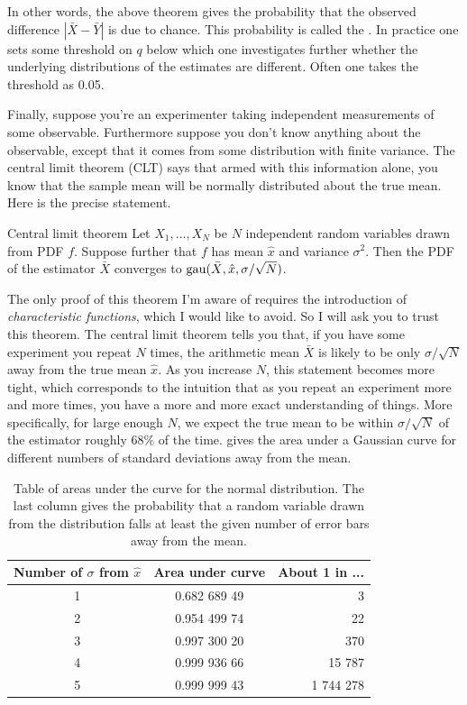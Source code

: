 In other words, the above theorem gives the probability that the
observed difference $|\bar{X}-\bar{Y}|$ is due to chance. This probability
is called the . In practice one sets some
threshold on $q$ below which one investigates further whether the
underlying distributions of the estimates are different. Often one
takes the threshold as 0.05.

Finally, suppose you're an experimenter taking independent measurements of
some observable. Furthermore suppose you don't know anything about the
observable, except that it comes from some distribution with finite variance.
The central limit theorem (CLT) says that armed with this information alone,
you know that the sample mean will be normally distributed about
the true mean. Here is the precise statement.
\begin{theorem}{Central limit theorem}{}
  Let $X_1,...,X_N$ be $N$ independent random variables drawn from PDF $f$.
  Suppose further that $f$ has mean $\hat{x}$ and variance $\sigma^2$.
  Then the PDF of the estimator $\bar{X}$ converges to
  $\operatorname{gau}(\bar{X},\hat{x},\sigma/\sqrt{N})$.
\end{theorem}
The only proof of this theorem I'm aware of requires the introduction of
{\it characteristic functions}, which I would like to avoid. So I will ask you
to trust this theorem. The central limit theorem tells you that, if you have
some experiment you repeat $N$ times, the arithmetic mean $\bar{X}$ is likely to
be only $\sigma/\sqrt{N}$ away from the true mean $\hat{x}$. As you increase
$N$, this statement becomes more tight, which corresponds to the intuition that
as you repeat an experiment more and more times, you have a more and more exact
understanding of things.
More specifically, for large enough $N$, we expect the true mean to be within
$\sigma/\sqrt{N}$ of the estimator roughly 68\% of the time.
 gives the area under a Gaussian curve
for different numbers of standard deviations away from the mean.

\begin{table}
\centering
\caption{Table of areas under the curve for the normal distribution.
The last column gives the probability that a random variable
drawn from the distribution falls at least the given number of error bars
away from the mean.}
\begin{tabularx}{\linewidth}{cCr}
\hline\hline
Number of $\sigma$ from $\hat{x}$ & Area under curve & About 1 in ...\\
 & 0.682 689 49 & 3\\
2 & 0.954 499 74 & 22\\
3 & 0.997 300 20 & 370\\
4 & 0.999 936 66 & 15 787\\
5 & 0.999 999 43 & 1 744 278\\
\hline\hline
\end{tabularx}
\label{tab:normal}
\end{table}


